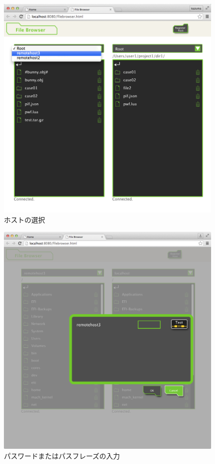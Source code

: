 \documentclass[a4paper,10pt,oneside]{jsbook}
\begin{document}
\begin{figure}[H]
	\begin{center}
		\includegraphics[width=12.0cm]{image/filebrowser_007.png}
	\end{center}
	\caption{ホストの選択}
	\label{fig:filebrowser_host1}
\end{figure}

\begin{figure}[H]
	\begin{center}
		\includegraphics[width=12.0cm]{image/filebrowser_011.png}
	\end{center}
	\caption{パスワードまたはパスフレーズの入力}
	\label{fig:filebrowser_host2}
\end{figure}
\end{document}
